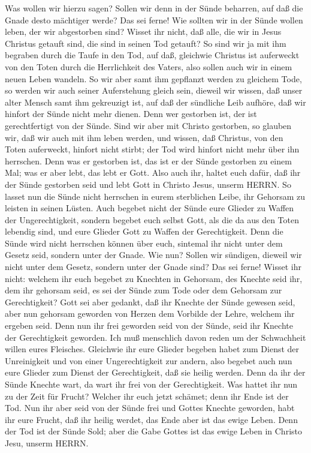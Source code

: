  Was wollen wir hierzu sagen? Sollen wir denn in der Sünde
beharren, auf daß die Gnade desto mächtiger werde?  Das sei
ferne! Wie sollten wir in der Sünde wollen leben, der wir abgestorben
sind?  Wisset ihr nicht, daß alle, die wir in Jesus Christus
getauft sind, die sind in seinen Tod getauft?  So sind wir
ja mit ihm begraben durch die Taufe in den Tod, auf daß, gleichwie
Christus ist auferweckt von den Toten durch die Herrlichkeit des Vaters,
also sollen auch wir in einem neuen Leben wandeln.  So wir
aber samt ihm gepflanzt werden zu gleichem Tode, so werden wir auch
seiner Auferstehung gleich sein,  dieweil wir wissen, daß
unser alter Mensch samt ihm gekreuzigt ist, auf daß der sündliche Leib
aufhöre, daß wir hinfort der Sünde nicht mehr dienen.  Denn
wer gestorben ist, der ist gerechtfertigt von der Sünde. 
Sind wir aber mit Christo gestorben, so glauben wir, daß wir auch mit
ihm leben werden,  und wissen, daß Christus, von den Toten
auferweckt, hinfort nicht stirbt; der Tod wird hinfort nicht mehr über
ihn herrschen.  Denn was er gestorben ist, das ist er der
Sünde gestorben zu einem Mal; was er aber lebt, das lebt er Gott.
 Also auch ihr, haltet euch dafür, daß ihr der Sünde
gestorben seid und lebt Gott in Christo Jesus, unserm HERRN.
 So lasset nun die Sünde nicht herrschen in eurem
sterblichen Leibe, ihr Gehorsam zu leisten in seinen Lüsten.
 Auch begebet nicht der Sünde eure Glieder zu Waffen der
Ungerechtigkeit, sondern begebet euch selbst Gott, als die da aus den
Toten lebendig sind, und eure Glieder Gott zu Waffen der Gerechtigkeit.
 Denn die Sünde wird nicht herrschen können über euch,
sintemal ihr nicht unter dem Gesetz seid, sondern unter der Gnade.
 Wie nun? Sollen wir sündigen, dieweil wir nicht unter dem
Gesetz, sondern unter der Gnade sind? Das sei ferne! 
Wisset ihr nicht: welchem ihr euch begebet zu Knechten in Gehorsam, des
Knechte seid ihr, dem ihr gehorsam seid, es sei der Sünde zum Tode oder
dem Gehorsam zur Gerechtigkeit?  Gott sei aber gedankt, daß
ihr Knechte der Sünde gewesen seid, aber nun gehorsam geworden von
Herzen dem Vorbilde der Lehre, welchem ihr ergeben seid. 
Denn nun ihr frei geworden seid von der Sünde, seid ihr Knechte der
Gerechtigkeit geworden.  Ich muß menschlich davon reden um
der Schwachheit willen eures Fleisches. Gleichwie ihr eure Glieder
begeben habet zum Dienst der Unreinigkeit und von einer Ungerechtigkeit
zur andern, also begebet auch nun eure Glieder zum Dienst der
Gerechtigkeit, daß sie heilig werden.  Denn da ihr der
Sünde Knechte wart, da wart ihr frei von der Gerechtigkeit.
 Was hattet ihr nun zu der Zeit für Frucht? Welcher ihr
euch jetzt schämet; denn ihr Ende ist der Tod.  Nun ihr
aber seid von der Sünde frei und Gottes Knechte geworden, habt ihr eure
Frucht, daß ihr heilig werdet, das Ende aber ist das ewige Leben.
 Denn der Tod ist der Sünde Sold; aber die Gabe Gottes ist
das ewige Leben in Christo Jesu, unserm HERRN.

